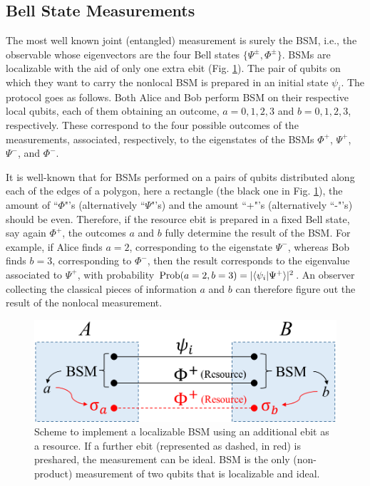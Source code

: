 \documentclass[a4paper,twocolumn,11pt,accepted=2024-02-14]{quantumarticle}
\newcommand{\braket}[2]{\langle {#1} \vphantom{#2} | {#2} \vphantom{#1} \rangle} %
\begin{document}
\subsection{Bell State Measurements}
\label{bsm}
The most well known joint (entangled) measurement is surely the BSM, i.e., the observable whose eigenvectors are the four Bell states $\{\Psi^\pm, \Phi^\pm \}$. BSMs are localizable with the aid of only one extra ebit (Fig. \ref{fig4}). The pair of qubits on which they want to carry the nonlocal BSM is prepared in an initial state $\psi_i$. The protocol goes as follows. Both Alice and Bob perform BSM on their respective local qubits, each of them obtaining an outcome, $a=0,1,2,3$ and $b=0,1,2,3$, respectively. These correspond to the four possible outcomes of the measurements, associated, respectively, to the eigenstates of the BSMs $\Phi^+$, $\Psi^+$, $\Psi^-$, and $\Phi^-$. 

It is well-known that for BSMs performed on a pairs of qubits distributed along each of the edges of a polygon, here a rectangle (the black one in Fig. \ref{fig4}), the amount of ``$\Phi$"'s (alternatively ``$\Psi$"'s) and the amount ``+"'s (alternatively ``-"'s) should be even. Therefore, if the resource ebit is prepared in a fixed Bell state, say again $\Phi^+$, the outcomes $a$ and $b$ fully determine the result of the BSM. For example, if Alice finds $a=2$, corresponding to the eigenstate $\Psi^-$, whereas Bob finds $b=3$, corresponding to $\Phi^-$, then the result corresponds to the eigenvalue associated to $\Psi^+$, with probability $\text{Prob}(a=2,b=3)=|\braket{\psi_i}{\Psi^+}|^2$. An observer collecting the classical pieces of information $a$ and $b$ can therefore figure out the result of the nonlocal measurement. 
 \begin{figure}[ht]
    \centering
    \includegraphics[width=.48\textwidth]{bsm.png}
    \caption{Scheme to implement a localizable BSM using an additional ebit as a resource. If a further ebit (represented as dashed, in red) is preshared, the measurement can be ideal. BSM is the only (non-product) measurement of two qubits that is localizable and ideal.}
    \label{fig4}
\end{figure}
\end{document}
